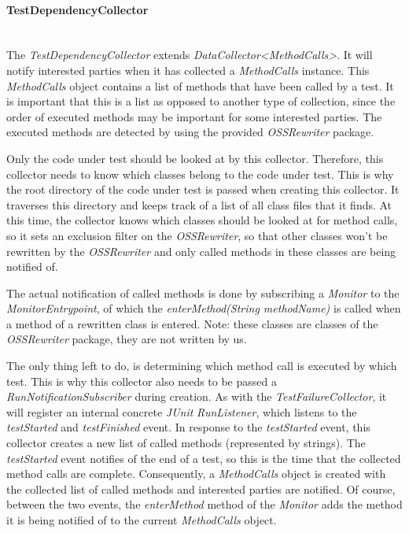 \documentclass[i2]{oss}
\newcommand{\class}[1]{\emph{#1}}
\newcommand{\method}[1]{\emph{#1}}
\newcommand{\junit}{\emph{JUnit }}
\begin{document}
\paragraph{TestDependencyCollector} 
\hfill \\
The \class{TestDependencyCollector} extends \class{DataCollector<MethodCalls>}.
It will notify interested parties when it has collected a \class{MethodCalls} instance.
This \class{MethodCalls} object contains a list of methods that have been called by a test.
It is important that this is a list as opposed to another type of collection, since the order of executed methods may be important for some interested parties.
The executed methods are detected by using the provided \class{OSSRewriter} package.

Only the code under test should be looked at by this collector.
Therefore, this collector needs to know which classes belong to the code under test.
This is why the root directory of the code under test is passed when creating this collector.
It traverses this directory and keeps track of a list of all class files that it finds.
At this time, the collector knows which classes should be looked at for method calls, so it sets an exclusion filter on the \class{OSSRewriter}, so that other classes won't be rewritten by the \class{OSSRewriter} and only called methods in these classes are being notified of.

The actual notification of called methods is done by subscribing a \class{Monitor} to the \class{MonitorEntrypoint}, of which the \method{enterMethod(String methodName)} is called when a method of a rewritten class is entered. Note: these classes are classes of the \class{OSSRewriter} package, they are not written by us.

The only thing left to do, is determining which method call is executed by which test.
This is why this collector also needs to be passed a \class{RunNotificationSubscriber} during creation.
As with the \class{TestFailureCollector}, it will register an internal concrete \junit \class{RunListener}, which listens to the \emph{testStarted} and \emph{testFinished} event.
In response to the \emph{testStarted} event, this collector creates a new list of called methods (represented by strings).
The \emph{testStarted} event notifies of the end of a test, so this is the time that the collected method calls are complete. Consequently, a \class{MethodCalls} object is created with the collected list of called methods and interested parties are notified.
Of course, between the two events, the \method{enterMethod} method of the \class{Monitor} adds the method it is being notified of to the current \class{MethodCalls} object.
\end{document}
